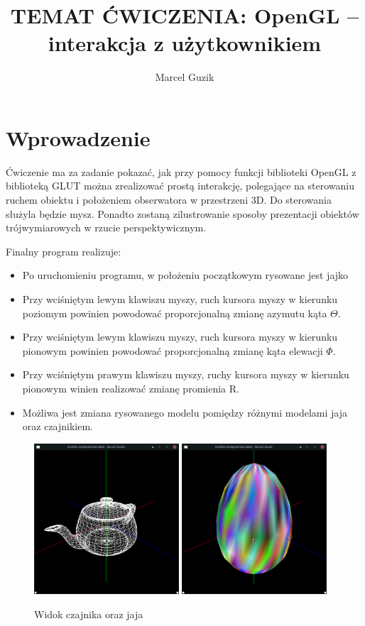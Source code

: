 \documentclass[a4paper]{article}
\title{TEMAT ĆWICZENIA: OpenGL – interakcja z użytkownikiem}
\author{Marcel Guzik}
\begin{document}
\section{Wprowadzenie}

Ćwiczenie ma za zadanie pokazać, jak przy pomocy funkcji biblioteki OpenGL z
biblioteką GLUT można zrealizować prostą interakcję, polegające na sterowaniu
ruchem obiektu i położeniem obserwatora w przestrzeni 3D. Do sterowania służyla
będzie mysz. Ponadto zostaną zilustrowanie sposoby prezentacji obiektów
trójwymiarowych w rzucie perspektywicznym.


Finalny program realizuje:
\begin{itemize}
    \item Po uruchomieniu programu, w położeniu początkowym rysowane jest jajko
    \item Przy wciśniętym lewym klawiszu myszy, ruch kursora myszy w kierunku
          poziomym powinien powodować proporcjonalną zmianę azymutu kąta
          $\Theta$.
    \item Przy wciśniętym lewym klawiszu myszy, ruch kursora myszy w kierunku
          pionowym powinien powodować proporcjonalną zmianę kąta elewacji
          $\Phi$.
    \item Przy wciśniętym prawym klawiszu myszy, ruchy kursora myszy w kierunku
          pionowym winien realizować zmianę promienia R.
    \item Możliwa jest zmiana rysowanego modelu pomiędzy różnymi modelami jaja
          oraz czajnikiem.
\end{itemize}

\begin{figure}[H]
    \centering
    \includegraphics[width=0.48\textwidth]{teapot}
    \includegraphics[width=0.48\textwidth]{egg}
    \caption{Widok czajnika oraz jaja}
\end{figure}
\end{document}
